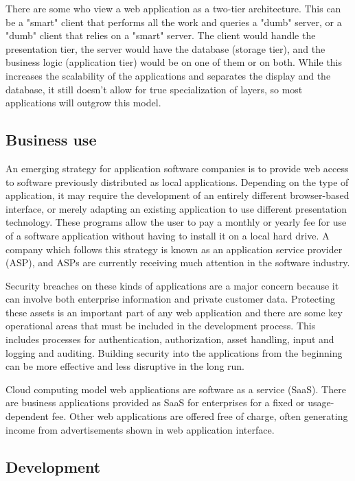There are some who view a web application as a two-tier architecture. This can be a "smart" client that performs all the work and queries a "dumb" server, or a "dumb" client that relies on a "smart" server. The client would handle the presentation tier, the server would have the database (storage tier), and the business logic (application tier) would be on one of them or on both.\cite{krunalMakeNtierArchitecture2008} While this increases the scalability of the applications and separates the display and the database, it still doesn't allow for true specialization of layers, so most applications will outgrow this model.

\subsection{Business use}

An emerging strategy for application software companies is to provide web access to software previously distributed as local applications. Depending on the type of application, it may require the development of an entirely different browser-based interface, or merely adapting an existing application to use different presentation technology. These programs allow the user to pay a monthly or yearly fee for use of a software application without having to install it on a local hard drive. A company which follows this strategy is known as an application service provider (ASP), and ASPs are currently receiving much attention in the software industry.

Security breaches on these kinds of applications are a major concern because it can involve both enterprise information and private customer data. Protecting these assets is an important part of any web application and there are some key operational areas that must be included in the development process. This includes processes for authentication, authorization, asset handling, input and logging and auditing. Building security into the applications from the beginning can be more effective and less disruptive in the long run.

Cloud computing model web applications are software as a service (SaaS). There are business applications provided as SaaS for enterprises for a fixed or usage-dependent fee. Other web applications are offered free of charge, often generating income from advertisements shown in web application interface\cite{curtisfranklinjrTopTipsSecure2011}.

\subsection{Development}

